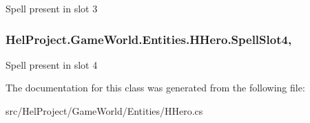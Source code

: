 Spell present in slot 3 

\hypertarget{class_hel_project_1_1_game_world_1_1_entities_1_1_h_hero_a20b187db40947594071dd7454380f23d}{}
\subsubsection[{Spell\+Slot4}]{ Hel\+Project.\+Game\+World.\+Entities.\+H\+Hero.\+Spell\+Slot4\hspace{0.3cm}{\ttfamily [get]}, {\ttfamily [set]}}\label{class_hel_project_1_1_game_world_1_1_entities_1_1_h_hero_a20b187db40947594071dd7454380f23d}


Spell present in slot 4 



The documentation for this class was generated from the following file\+:\begin{DoxyCompactItemize}
\item 
src/\+Hel\+Project/\+Game\+World/\+Entities/H\+Hero.\+cs\end{DoxyCompactItemize}
